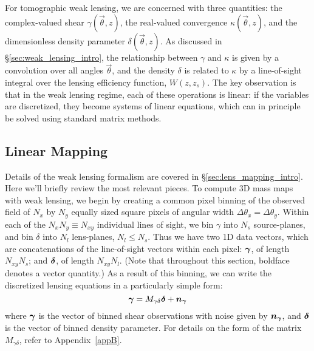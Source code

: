 For tomographic weak lensing, we are concerned with three quantities:  the 
complex-valued shear $\gamma(\vec\theta,z)$, the real-valued convergence
$\kappa(\vec\theta,z)$, and the dimensionless density parameter 
$\delta(\vec\theta,z)$.  As discussed in \S\ref{sec:weak_lensing_intro},
the relationship between $\gamma$ and $\kappa$ is given
by a convolution over all angles $\vec\theta$, and the density $\delta$ is
related to $\kappa$ by a line-of-sight integral over the lensing efficiency
function, $W(z,z_s)$.  The key observation is that in the weak lensing regime,
each of these operations is linear: if the variables are discretized, 
they become systems of linear equations, 
which can in principle be solved using standard matrix methods.

\subsection{Linear Mapping}
\label{LinearMapping}

Details of the weak lensing formalism are covered in
\S\ref{sec:lens_mapping_intro}.  Here we'll briefly review the
most relevant pieces.
To compute 3D mass maps with weak lensing, we begin by
creating a common pixel binning of the observed field of 
$N_x$ by $N_y$ equally sized square pixels
of angular width $\Delta\theta_x = \Delta\theta_y$.  
Within each of the $N_x N_y \equiv N_{xy}$ individual
lines of sight, we bin $\gamma$ into $N_s$ source-planes,
and bin $\delta$ into $N_l$ lens-planes, $N_l \le N_s$.  
Thus we have two 1D data vectors, which are concatenations of
the line-of-sight vectors within each pixel:
 $\boldsymbol{\gamma}$, of length $N_{xy} N_s$; 
and $\boldsymbol{\delta}$, of length $N_{xy} N_l$.  
(Note that throughout this section, boldface denotes a vector quantity.)  
As a result of this binning, we can write the discretized lensing 
equations in a particularly simple form:
\begin{equation}
  \label{M_gd}
  \boldsymbol{\gamma} = M_{\gamma\delta}\boldsymbol{\delta} + \boldsymbol{n_\gamma}
\end{equation}
where $\boldsymbol{\gamma}$ is the vector of binned shear observations with noise
given by $\boldsymbol{n_\gamma}$, and $\boldsymbol{\delta}$ is the vector 
of binned density parameter.  For details on the form of 
the matrix $M_{\gamma\delta}$, refer to Appendix~\ref{appB}.

